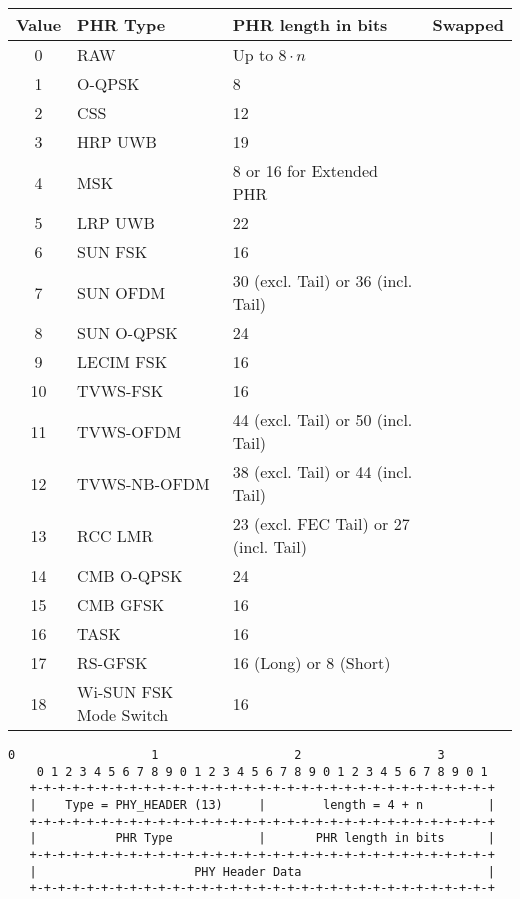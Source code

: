 \documentclass[12pt]{article}
\newcommand\checkmark{\usym{1F5F8}}
\renewcommand\_{\textunderscore\allowbreak}
\begin{document}
\begin{tabular}{c | l | l | c}
    \textbf{Value}  & \textbf{PHR Type} & \textbf{PHR length in bits} & \textbf{Swapped}\\
\hline
    0  & RAW                    & Up to $8\cdot n$\\
    1  & O-QPSK                 & 8 \\
    2  & CSS                    & 12 \\
    3  & HRP UWB                & 19 \\
    4  & MSK                    & 8 or 16 for Extended PHR \\
    5  & LRP UWB                & 22 \\
    6  & SUN FSK                & 16 & \checkmark \\
    7  & SUN OFDM               & 30 (excl. Tail) or 36 (incl. Tail) & \checkmark \\
    8  & SUN O-QPSK             & 24 \\
    9  & LECIM FSK              & 16 & \checkmark \\
    10 & TVWS-FSK               & 16 & \checkmark \\
    11 & TVWS-OFDM              & 44 (excl. Tail) or 50 (incl. Tail) & \checkmark \\
    12 & TVWS-NB-OFDM           & 38 (excl. Tail) or 44 (incl. Tail) & \checkmark \\
    13 & RCC LMR                & 23 (excl. FEC Tail) or 27 (incl. Tail) & \checkmark \\
    14 & CMB O-QPSK             & 24 & \checkmark \\
    15 & CMB GFSK               & 16 & \checkmark \\
    16 & TASK                   & 16 \\
    17 & RS-GFSK                & 16 (Long) or 8 (Short) & \checkmark \\
    18 & Wi-SUN FSK Mode Switch & 16 & \checkmark \\
\end{tabular}

\begin{Verbatim}[samepage=true]
    0                   1                   2                   3
    0 1 2 3 4 5 6 7 8 9 0 1 2 3 4 5 6 7 8 9 0 1 2 3 4 5 6 7 8 9 0 1
   +-+-+-+-+-+-+-+-+-+-+-+-+-+-+-+-+-+-+-+-+-+-+-+-+-+-+-+-+-+-+-+-+
   |    Type = PHY_HEADER (13)     |        length = 4 + n         |
   +-+-+-+-+-+-+-+-+-+-+-+-+-+-+-+-+-+-+-+-+-+-+-+-+-+-+-+-+-+-+-+-+
   |           PHR Type            |       PHR length in bits      |
   +-+-+-+-+-+-+-+-+-+-+-+-+-+-+-+-+-+-+-+-+-+-+-+-+-+-+-+-+-+-+-+-+
   |                      PHY Header Data                          |
   +-+-+-+-+-+-+-+-+-+-+-+-+-+-+-+-+-+-+-+-+-+-+-+-+-+-+-+-+-+-+-+-+
\end{Verbatim}
\end{document}
